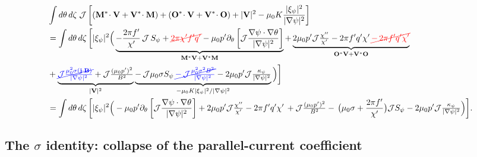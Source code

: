 \documentclass[10pt,a4paper]{article}
\numberwithin{equation}{section}
\begin{document}
\begin{equation}
\begin{aligned}
&\int d\theta\,d\zeta\;\mathcal J
\left[
(\mathbf M^*\!\cdot\mathbf V+\mathbf V^*\!\cdot\mathbf M)
+(\mathbf O^*\!\cdot\mathbf V+\mathbf V^*\!\cdot\mathbf O)
+|\mathbf V|^2
-\mu_0K\frac{|\xi_\psi|^2}{|\nabla\psi|^2}
\right]\\
&=\int d\theta\,d\zeta\,
\bigg[|\xi_\psi|^2\Big(
\underbrace{-\frac{2\pi f'}{\chi'}\,\mathcal J\,S_\psi+{\color{red}\cancel{2\pi \chi' f'q'}}
-\mu_0p'\partial_\theta\left[\mathcal J\frac{\nabla\psi\cdot\nabla\theta}{|\nabla\psi|^2}\right]}_{\mathbf M^*\mathbf V+\mathbf V^*\mathbf M}
+\underbrace{2\mu_0p'\mathcal J\tfrac{\chi''}{\chi'}-2\pi f'q'\chi'\,{\color{red}\cancel{-\,2\pi f'q'\chi'}}}_{\mathbf O^*\mathbf V+\mathbf V^*\mathbf O}\\
&+\underbrace{{\color{blue}\cancel{\mathcal J\tfrac{\mu_0^2\sigma(\mathbf j\cdot\mathbf B)}{|\nabla\psi|^2}}}
+\mathcal J\tfrac{(\mu_0p')^2}{B^2}}_{|\mathbf V|^2}
\underbrace{-\,\mathcal J\mu_0\sigma S_\psi
\,{\color{blue}\cancel{-\,\mathcal J\tfrac{\mu_0^2\sigma^2B^2}{|\nabla\psi|^2}}}
-2\mu_0p'\mathcal J\tfrac{\kappa_\psi}{|\nabla\psi|^2}}_{-\mu_0K|\xi_\psi|^2/|\nabla\psi|^2}
\Big)
\bigg]\\
&=\int d\theta\,d\zeta\,
\bigg[|\xi_\psi|^2\Big(
-\mu_0p'\partial_\theta\left[\mathcal J\frac{\nabla\psi\cdot\nabla\theta}{|\nabla\psi|^2}\right]
+2\mu_0p'\mathcal J\tfrac{\chi''}{\chi'}-2\pi f'q'\chi'\,
+\mathcal J\tfrac{(\mu_0p')^2}{B^2}
-\,\big(\mu_0\sigma +\frac{2\pi f'}{\chi'}\big)\mathcal JS_\psi
-2\mu_0p'\mathcal J\tfrac{\kappa_\psi}{|\nabla\psi|^2}
\Big)\bigg].
\end{aligned}
\end{equation}

\subsection{The $\sigma$ identity: collapse of the parallel-current coefficient}
\label{app:sigma}
\end{document}
